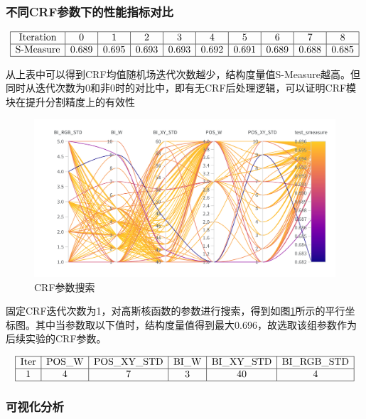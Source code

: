 \documentclass[a4paper,12pt]{ctexart}
\begin{document}
\subsubsection{不同CRF参数下的性能指标对比}
\label{sec:crfparam}

\[\begin{array}{|c|c|c|c|c|c|c|c|c|c|}
    \hline
    \text{Iteration} & 0 & 1 & 2 & 3 & 4 & 5 & 6 & 7 & 8 \\
    \hline
    \text{S-Measure} & 0.689 & 0.695 & 0.693 & 0.693 & 0.692 & 0.691 & 0.689 & 0.688 & 0.685 \\
    \hline
\end{array}
\]

从上表中可以得到CRF均值随机场迭代次数越少，结构度量值S-Measure越高。但同时从迭代次数为0和非0时的对比中，即有无CRF后处理逻辑，可以证明CRF模块在提升分割精度上的有效性

\begin{figure}[h]
    \centering
    \includegraphics[width=\textwidth]{figures/crfparam_search.png}
    \caption{CRF参数搜索}
    \label{fig:crfps}
\end{figure}

固定CRF迭代次数为1，对高斯核函数的参数进行搜索，得到如图\ref{fig:crfps}所示的平行坐标图。其中当参数取以下值时，结构度量值得到最大0.696，故选取该组参数作为后续实验的CRF参数。

\[\begin{array}{|c|c|c|c|c|c|c|c|c|c|}
    \hline
    \text{Iter} & $POS\_W$ & $POS\_XY\_STD$ & $BI\_W$ & $BI\_XY\_STD$ & $BI\_RGB\_STD$ \\
    \hline
    1 & 4 & 7 & 3 & 40 & 4 \\
    \hline
\end{array}
\]

\subsubsection{可视化分析}
\label{sec:visual}
\end{document}
